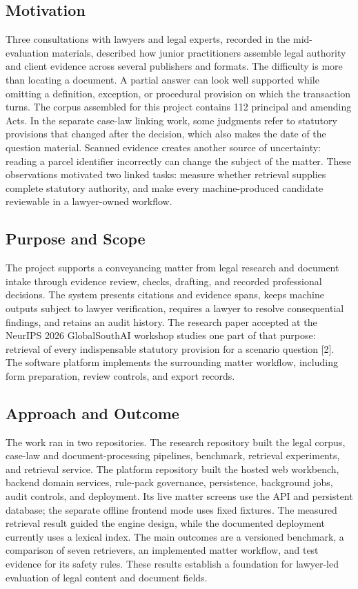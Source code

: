 \documentclass[12pt,a4paper]{article}
\begin{document}
\subsection{Motivation}

Three consultations with lawyers and legal experts, recorded in the mid-evaluation materials, described how junior practitioners assemble legal authority and client evidence across several publishers and formats. The difficulty is more than locating a document. A partial answer can look well supported while omitting a definition, exception, or procedural provision on which the transaction turns. The corpus assembled for this project contains 112 principal and amending Acts. In the separate case-law linking work, some judgments refer to statutory provisions that changed after the decision, which also makes the date of the question material. Scanned evidence creates another source of uncertainty: reading a parcel identifier incorrectly can change the subject of the matter. These observations motivated two linked tasks: measure whether retrieval supplies complete statutory authority, and make every machine-produced candidate reviewable in a lawyer-owned workflow.


\subsection{Purpose and Scope}

The project supports a conveyancing matter from legal research and document intake through evidence review, checks, drafting, and recorded professional decisions. The system presents citations and evidence spans, keeps machine outputs subject to lawyer verification, requires a lawyer to resolve consequential findings, and retains an audit history. The research paper accepted at the NeurIPS 2026 GlobalSouthAI workshop studies one part of that purpose: retrieval of every indispensable statutory provision for a scenario question [2]. The software platform implements the surrounding matter workflow, including form preparation, review controls, and export records.


\subsection{Approach and Outcome}

The work ran in two repositories. The research repository built the legal corpus, case-law and document-processing pipelines, benchmark, retrieval experiments, and retrieval service. The platform repository built the hosted web workbench, backend domain services, rule-pack governance, persistence, background jobs, audit controls, and deployment. Its live matter screens use the API and persistent database; the separate offline frontend mode uses fixed fixtures. The measured retrieval result guided the engine design, while the documented deployment currently uses a lexical index. The main outcomes are a versioned benchmark, a comparison of seven retrievers, an implemented matter workflow, and test evidence for its safety rules. These results establish a foundation for lawyer-led evaluation of legal content and document fields.
\end{document}

